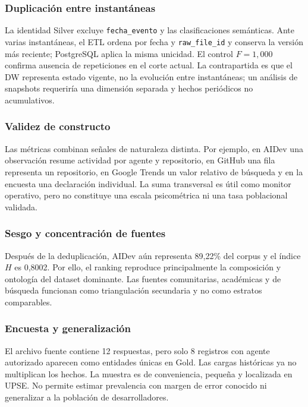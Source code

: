 \documentclass[12pt,a4paper]{article}
\newcommand{\pathcode}[1]{\begingroup\small\ttfamily\nolinkurl{#1}\endgroup}
\begin{document}
\subsubsection{Duplicación entre instantáneas}

La identidad Silver excluye \pathcode{fecha_evento} y las clasificaciones semánticas. Ante varias instantáneas, el ETL ordena por fecha y \pathcode{raw_file_id} y conserva la versión más reciente; PostgreSQL aplica la misma unicidad. El control $F=1,000$ confirma ausencia de repeticiones en el corte actual. La contrapartida es que el DW representa estado vigente, no la evolución entre instantáneas; un análisis de snapshots requeriría una dimensión separada y hechos periódicos no acumulativos.

\subsubsection{Validez de constructo}

Las métricas combinan señales de naturaleza distinta. Por ejemplo, en AIDev una observación resume actividad por agente y repositorio, en GitHub una fila representa un repositorio, en Google Trends un valor relativo de búsqueda y en la encuesta una declaración individual. La suma transversal es útil como monitor operativo, pero no constituye una escala psicométrica ni una tasa poblacional validada.

\subsubsection{Sesgo y concentración de fuentes}

Después de la deduplicación, AIDev aún representa 89,22\% del corpus y el índice $H$ es 0,8002. Por ello, el ranking reproduce principalmente la composición y ontología del dataset dominante. Las fuentes comunitarias, académicas y de búsqueda funcionan como triangulación secundaria y no como estratos comparables.

\subsubsection{Encuesta y generalización}

El archivo fuente contiene 12 respuestas, pero solo 8 registros con agente autorizado aparecen como entidades únicas en Gold. Las cargas históricas ya no multiplican los hechos. La muestra es de conveniencia, pequeña y localizada en UPSE. No permite estimar prevalencia con margen de error conocido ni generalizar a la población de desarrolladores.
\end{document}
